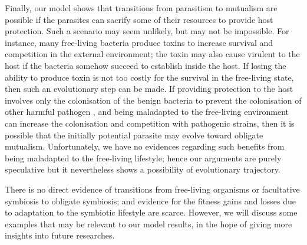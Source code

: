 \documentclass[11.5pt]{article}
\begin{document}
\medskip

Finally, our model shows that transitions from parasitism to mutualism are possible if the parasites can sacrify some of their resources to provide host protection. Such a scenario may seem unlikely, but may not be impossible. For instance, many free-living bacteria produce toxins to increase survival and competition in the external environment; the toxin may also cause virulent to the host if the bacteria somehow succeed to establish inside the host. If losing the ability to produce toxin is not too costly for the survival in the free-living state, then such an evolutionary step can be made. If providing protection to the host involves only the colonisation of the benign bacteria to prevent the colonisation of other harmful pathogen \parencite{Krediet2013}, and being maladapted to the free-living environment can increase the colonisation and competition with pathogenic strains, then it is possible that the initially potential parasite may evolve toward obligate mutualism. Unfortunately, we have no evidences regarding such benefits from being maladapted to the free-living lifestyle; hence our arguments are purely speculative but it nevertheless shows a possibility of evolutionary trajectory.  

\medskip

There is no direct evidence of transitions from free-living organisms or facultative symbiosis to obligate symbiosis; and evidence for the fitness gains and losses due to adaptation to the symbiotic lifestyle are scarce. However, we will discuss some examples that may be relevant to our model results, in the hope of giving more insights into future researches. 

\medskip
\end{document}
